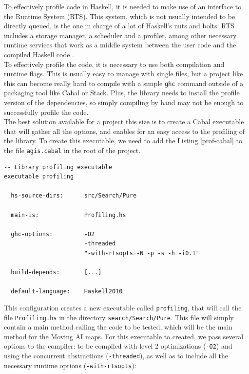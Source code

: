 To effectively profile code in Haskell, it is needed to make use of an
interface to the Runtime System (RTS). This system, which is not usually
intended to be directly queued, is the one in charge of a lot of Haskell's nuts
and bolts: RTS includes a storage manager, a scheduler and a profiler, among
other necessary runtime services that work as a middle system between the user
code and the compiled Haskell code \cite{ghc}.\\

To effectively profile the code, it is necessary to use both compilation and
runtime flags. This is usually easy to manage with single files, but a project
like this can become really hard to compile with a simple \texttt{ghc} command
outside of a packaging tool like Cabal or Stack. Plus, the library needs to
install the profile version of the dependencies, so simply compiling by hand
may not be enough to successfully profile the code.\\

The best solution available for a project this size is to create a Cabal
executable that will gather all the options, and enables for an easy access to
the profiling of the library. To create this executable, we need to add the
Listing \ref{prof-cabal} to the file \texttt{agis.cabal} in the root of the
project.\\

\begin{lstlisting}[style=haskell, label=prof-cabal, caption=
Setup for the \texttt{profiling} executable in the Cabal file]
-- Library profiling executable
executable profiling

  hs-source-dirs:      src/Search/Pure
           
  main-is:             Profiling.hs
  
  ghc-options:         -O2
                       -threaded
                       "-with-rtsopts=-N -p -s -h -i0.1"

  build-depends:       [...]

  default-language:    Haskell2010
\end{lstlisting}

This configuration creates a new executable called \texttt{profiling}, that
will call the file \texttt{Profiling.hs} in the directory
\texttt{search/Search/Pure}. This file will simply contain a main method
calling the code to be tested, which will be the main method for the Moving AI
maps. For this executable to created, we pass several options to the compiler:
to be compiled with level 2 optimizations (\texttt{-O2}) and using the
concurrent abstractions (\texttt{-threaded}), as well as to include all the
necessary runtime options (\texttt{-with-rtsopts}):

